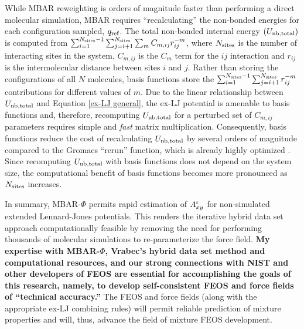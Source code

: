 \documentclass[12pt,a4paper]{article}
\begin{document}
While MBAR reweighting is orders of magnitude faster than performing a direct molecular simulation, MBAR requires ``recalculating'' the non-bonded energies for each configuration sampled, $q_{\rm ref}$. The total non-bonded internal energy $(U_{\rm nb, total})$ is computed from $\sum_{i=1}^{N_{\rm sites}-1} \sum_{j=i+1}^{N_{\rm sites}} \sum_m C_{m,ij} r_{ij}^{-m}$, where $N_{\rm sites}$ is the number of interacting sites in the system, $C_{m,ij}$ is the $C_{m}$ term for the $ij$ interaction and $r_{ij}$ is the intermolecular distance between sites $i$ and $j$. Rather than storing the configurations of all $N$ molecules, basis functions store the $\sum_{i=1}^{N_{\rm sites}-1} \sum_{j=i+1}^{N_{\rm sites}} r_{ij}^{-m}$ contributions for different values of $m$. Due to the linear relationship between $U_{\rm nb, total}$ and Equation \ref{ex-LJ general}, the ex-LJ potential is amenable to basis functions and, therefore, recomputing $U_{\rm nb, total}$ for a perturbed set of $C_{m,ij}$ parameters requires simple and \textit{fast} matrix multiplication. Consequently, basis functions reduce the cost of recalculating $U_{\rm nb, total}$ by several orders of magnitude compared to the Gromacs ``rerun'' function, which is already highly optimized \cite{GROMACS_2018}. Since recomputing $U_{\rm nb, total}$ with basis functions does not depend on the system size, the computational benefit of basis functions becomes more pronounced as $N_{\rm sites}$ increases.

In summary, MBAR-$\Phi$ permits rapid estimation of $A_{xy}^{\rm r}$ for non-simulated extended Lennard-Jones potentials. This renders the iterative hybrid data set approach computationally feasible by removing the need for performing thousands of molecular simulations to re-parameterize the force field. \textbf{My expertise with MBAR-$\Phi$, Vrabec's hybrid data set method and computational resources, and our strong connections with NIST and other developers of FEOS are essential for accomplishing the goals of this research, namely, to develop self-consistent FEOS and force fields of ``technical accuracy.''} The FEOS and force fields (along with the appropriate ex-LJ combining rules) will permit reliable prediction of mixture properties and will, thus, advance the field of mixture FEOS development. 

\end{document}

